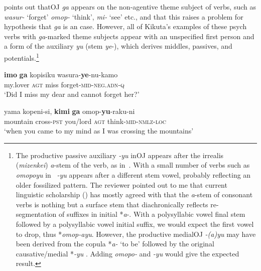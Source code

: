 \documentclass[output=paper]{LSP/langsci}
\begin{document}
\citet{Kikuta2012Jodai} points out thatOJ  \textit{ga} appears on the non-agentive theme subject of  verbs, such as \textit{wasur-} ‘forget’ \textit{omop-} ‘think’, \textit{mi-} ‘see’ etc., and that this raises a problem for  hypothesis that \textit{ga} is an  case. However, all of Kikuta’s examples of these psych verbs with \textit{ga}-marked theme subjects appear with an unspecified first person  and a form of the auxiliary \textit{yu} (stem \textit{ye}-), which derives middles, passives, and potentials.\footnote{The
  productive passive auxiliary \textit{-yu} inOJ  appears after the irrealis (\textit{mizenkei}) \textit{a}{}-stem of the verb, as in~. With a small number of verbs such as \textit{omopoyu} in~ \textit{-yu} appears after a different stem vowel, probably reflecting an older fossilized pattern. The reviewer pointed out to me that current linguistic scholarship (\cf \citealt{Whitman2008Source,Frellesvig2010Japanese,Robbeets2015Diachrony}) has mostly agreed with \citet{Ohno1953Nihongo} that the \textit{a}-stem of consonant verbs is nothing but a surface stem that diachronically reflects re-segmentation of suffixes in initial *\textit{a}-. With a polysyllabic vowel final stem followed by a polysyllabic vowel initial suffix, we would expect the first vowel to drop, thus *\textit{omop-ayu}. However, the productive medialOJ  \textit{-(a)yu} may have been derived from the copula *\textit{a-} ‘to be’ followed by the original causative/medial *\textit{-yu} \citep{Robbeets2015Diachrony}. Adding \textit{omopo-} and \textit{-yu} would give the expected result.}

\begin{exe}
\ex%
\label{14-ya-ex:16}
\begin{xlist}
\ex
\label{14-ya-ex:16a}
\gll \textbf{imo} \textbf{ga} kopisiku wasura-\textbf{ye}-nu-kamo\\ %
my.lover \textsc{agt} miss forget-\textsc{mid}-\textsc{neg.adn}-\textsc{q}\\
\glt ‘Did I miss my dear and cannot forget her?’

\ex
\label{14-ya-ex:16b}
\gll yama kopeni-si, \textbf{kimi} \textbf{ga} omop-\textbf{yu}-raku-ni\\ %
mountain cross-\textsc{pst} you/lord \textsc{agt} think-\textsc{mid}-\textsc{nmlz}-\textsc{loc}\\
\glt ‘when you came to my mind as I was crossing the mountains’
\end{xlist}
\end{exe}
\end{document}
